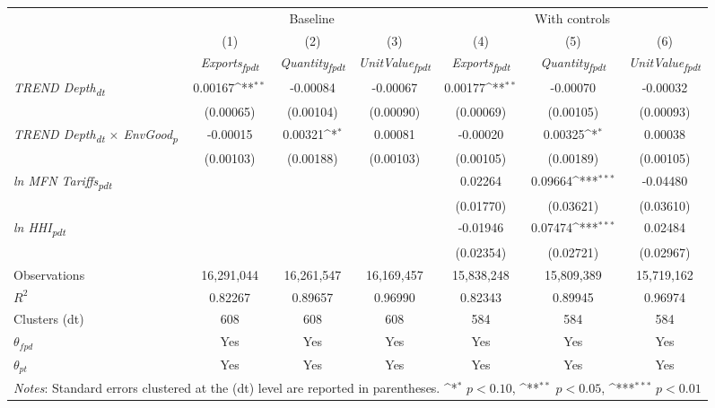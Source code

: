 {
\def\sym#1{\ifmmode^{#1}\else\(^{#1}\)\fi}
\begin{tabular}{l*{6}{c}}
\toprule
&\multicolumn{3}{c}{Baseline}&\multicolumn{3}{c}{With controls}\\\cmidrule(lr){2-4}\cmidrule(lr){5-7}
&(1)&(2)&(3)&(4)&(5)&(6)\\
&\textit{Exports\textsubscript{fpdt}}&\textit{Quantity\textsubscript{fpdt}}&\textit{UnitValue\textsubscript{fpdt}}&\textit{Exports\textsubscript{fpdt}}&\textit{Quantity\textsubscript{fpdt}}&\textit{UnitValue\textsubscript{fpdt}}\\
\midrule
\textit{TREND Depth\textsubscript{dt}} & 0.00167\sym{**} & -0.00084 & -0.00067 & 0.00177\sym{**} & -0.00070 & -0.00032\\
 & (0.00065) & (0.00104) & (0.00090) & (0.00069) & (0.00105) & (0.00093)\\
\addlinespace
\textit{TREND Depth\textsubscript{dt} $\times$ EnvGood\textsubscript{p}} & -0.00015 & 0.00321\sym{*} & 0.00081 & -0.00020 & 0.00325\sym{*} & 0.00038\\
 & (0.00103) & (0.00188) & (0.00103) & (0.00105) & (0.00189) & (0.00105)\\
\addlinespace
\textit{ln MFN Tariffs\textsubscript{pdt}} &  &  &  & 0.02264 & 0.09664\sym{***} & -0.04480\\
 &  &  &  & (0.01770) & (0.03621) & (0.03610)\\
\addlinespace
\textit{ln HHI\textsubscript{pdt}} &  &  &  & -0.01946 & 0.07474\sym{***} & 0.02484\\
 &  &  &  & (0.02354) & (0.02721) & (0.02967)\\
\midrule
Observations & 16,291,044 & 16,261,547 & 16,169,457 & 15,838,248 & 15,809,389 & 15,719,162\\
$R^{2}$ & 0.82267 & 0.89657 & 0.96990 & 0.82343 & 0.89945 & 0.96974\\
Clusters (dt) & 608 & 608 & 608 & 584 & 584 & 584\\
$\theta_{fpd}$ & Yes & Yes & Yes & Yes & Yes & Yes\\
$\theta_{pt}$ & Yes & Yes & Yes & Yes & Yes & Yes\\
\bottomrule
\multicolumn{7}{l}{\footnotesize \textit{Notes}: Standard errors clustered at the (dt) level are reported in parentheses. \sym{*} \(p<0.10\), \sym{**} \(p<0.05\), \sym{***} \(p<0.01\)}\\
\end{tabular}
}
